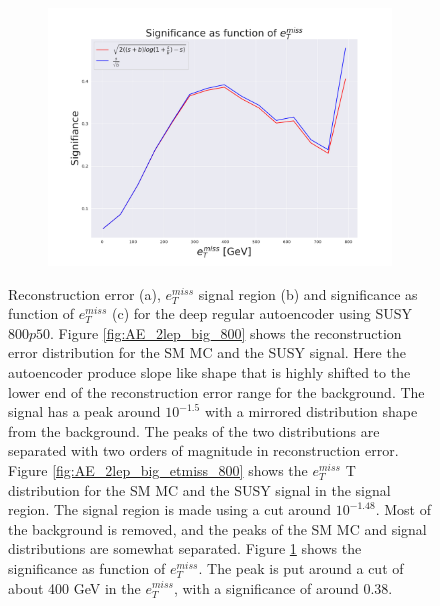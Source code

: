 \begin{figure}[H]
    \begin{subfigure}{.49\textwidth}
        \includegraphics[width=\textwidth]{Figures/AE_testing/big/2lep/significance_etmiss_800p0p050_-1.4833711230716062.pdf}
        \caption{}
        \label{fig:AE_2lep_big_signi_800}
    \end{subfigure}
    \hfill      
    \caption[2lep deep network | $800p50$ | AE]{Reconstruction error (a), $e_T^{miss}$ signal region (b) and significance as function of 
    $e_T^{miss}$ (c) for the deep regular autoencoder using SUSY $800p50$. 
    Figure \ref{fig:AE_2lep_big_800} shows the reconstruction error distribution for the SM MC and the SUSY signal. 
Here the autoencoder produce slope like shape that is highly shifted to the lower end of the reconstruction error range
for the background. The signal has a peak around $10^{-1.5}$ with a mirrored distribution shape from the background. The peaks of the two distributions are separated
with two orders of magnitude in reconstruction error. Figure \ref{fig:AE_2lep_big_etmiss_800} shows the $e_T^{miss}$
T distribution for the SM MC and the SUSY signal in the signal region. The signal region is made using a cut around
$10^{-1.48}$. Most of the background is removed, and the peaks of the SM MC and signal distributions are
somewhat separated.  Figure \ref{fig:AE_2lep_big_signi_800} shows the significance as function of $e_T^{miss}$. The peak is put 
around a cut of about 400 GeV in the $e_T^{miss}$, with a significance of around $0.38$.}
    \label{fig:AE_2lep_big_rec_sig_signi_800}
\end{figure}

